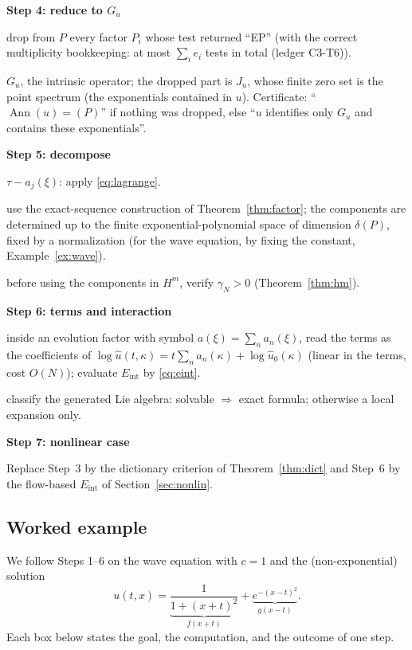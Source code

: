\documentclass[11pt,a4paper]{article}
\theoremstyle{definition}
\newcommand{\led}[1]{\textcolor{cG}{\textsf{\footnotesize(ledger #1)}}}
\newcommand{\stepblock}[2]{\par\Needspace{6\baselineskip}\medskip\noindent\textbf{\sffamily Step #1: #2}\par\nopagebreak\smallskip}
\newcommand{\Ann}{\operatorname{Ann}}
\newcommand{\Eint}{E_{\mathrm{int}}}
\begin{document}
\stepblock{4}{reduce to $G_u$}
\begin{description}[nosep,leftmargin=2.6cm,labelwidth=2.4cm]
\item[Does] drop from $P$ every factor $P_i$ whose test returned ``EP'' (with the correct multiplicity bookkeeping: at most $\sum_ie_i$ tests in total \led{C3-T6}).
\item[Returns] $G_u$, the intrinsic operator; the dropped part is $J_u$, whose finite zero set is the point spectrum (the exponentials contained in $u$). Certificate: ``$\Ann(u)=(P)$'' if nothing was dropped, else ``$u$ identifies only $G_u$ and contains these exponentials''.
\end{description}

\stepblock{5}{decompose}
\begin{description}[nosep,leftmargin=2.6cm,labelwidth=2.4cm]
\item[Evolution factors] $\tau-a_j(\xi)$: apply \eqref{eq:lagrange}.
\item[General coprime factors] use the exact-sequence construction of Theorem~\ref{thm:factor}; the components are determined up to the finite exponential-polynomial space of dimension $\delta(P)$, fixed by a normalization (for the wave equation, by fixing the constant, Example~\ref{ex:wave}).
\item[Check] before using the components in $H^m$, verify $\gamma_N>0$ (Theorem~\ref{thm:hm}).
\end{description}

\stepblock{6}{terms and interaction}
\begin{description}[nosep,leftmargin=2.6cm,labelwidth=2.4cm]
\item[Does] inside an evolution factor with symbol $a(\xi)=\sum_na_n(\xi)$, read the terms as the coefficients of $\log\hat u(t,\kappa)=t\sum_na_n(\kappa)+\log\hat u_0(\kappa)$ (linear in the terms, cost $O(N)$); evaluate $\Eint$ by \eqref{eq:eint}.
\item[Non-commuting] classify the generated Lie algebra: solvable $\Rightarrow$ exact formula; otherwise a local expansion only.
\end{description}

\stepblock{7}{nonlinear case}
Replace Step~3 by the dictionary criterion of Theorem~\ref{thm:dict} and Step~6 by the flow-based $\Eint$ of Section~\ref{sec:nonlin}.

\subsection{Worked example}
We follow Steps 1--6 on the wave equation with $c=1$ and the (non-exponential) solution
\[
u(t,x)=\underbrace{\frac{1}{1+(x+t)^2}}_{f(x+t)}+\underbrace{e^{-(x-t)^2}}_{g(x-t)} .
\]
Each box below states the goal, the computation, and the outcome of one step.
\end{document}
